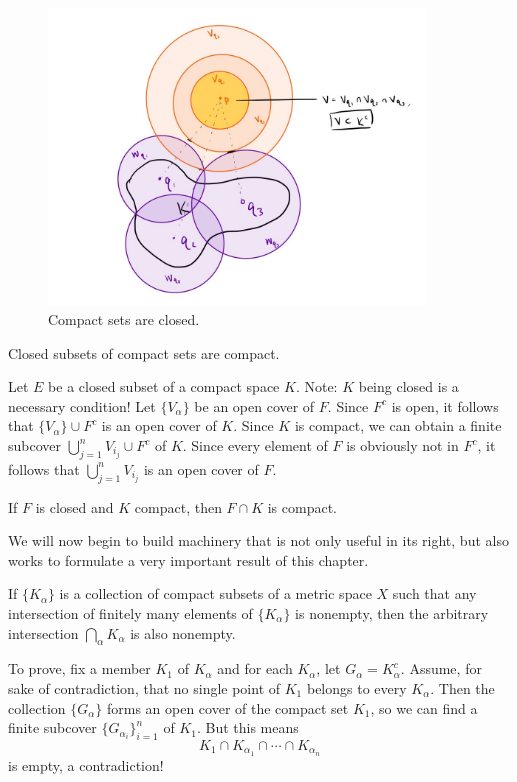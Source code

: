 \documentclass{article}
\begin{document}
\begin{figure}
    \centering
    \includegraphics[width=10cm]{ClosedCompact.jpeg}
    \caption{Compact sets are closed.}
    \label{fig:galaxy}
\end{figure}
\begin{theorem}
    Closed subsets of compact sets are compact.
\end{theorem}
\begin{remark}
    Let $E$ be a closed subset of a compact space $K$. Note: $K$ being closed is a necessary condition! Let $\{V_{\alpha}\}$ be an open cover of $F$. Since $F^{c}$ is open, it follows that $\{V_{\alpha}\}\cup F^{c}$ is an open cover of $K$. Since $K$ is compact, we can obtain a finite subcover $\bigcup_{j=1}^{n}V_{i_{j}}\cup F^{c}$ of $K$. Since every element of $F$ is obviously not in $F^{c}$, it follows that $\bigcup_{j=1}^{n}V_{i_{j}}$ is an open cover of $F$.
\end{remark}
\begin{corollary}
    If $F$ is closed and $K$ compact, then $F\cap K$ is compact.
\end{corollary}
We will now begin to build machinery that is not only useful in its right, but also works to formulate a very important result of this chapter.
\begin{theorem}
    If $\{K_{\alpha}\}$ is a collection of compact subsets of a metric space $X$ such that any intersection of finitely many elements of $\{K_{\alpha}\}$ is nonempty, then the arbitrary intersection $\bigcap_{\alpha}K_{\alpha}$ is also nonempty.
\end{theorem}
\begin{remark}
    To prove, fix a member $K_{1}$ of $K_{\alpha}$ and for each $K_{\alpha}$, let $G_{\alpha}=K_{\alpha}^{c}$. Assume, for sake of contradiction, that no single point of $K_{1}$ belongs to every $K_{\alpha}$. Then the collection $\{G_{\alpha}\}$ forms an open cover of the compact set $K_{1}$, so we can find a finite subcover $\{G_{\alpha_{i}}\}_{i=1}^{n}$ of $K_{1}$. But this means \[K_{1}\cap K_{\alpha_{1}}\cap\dotsi\cap K_{\alpha_{n}}\]is empty, a contradiction!
\end{remark}
\end{document}
